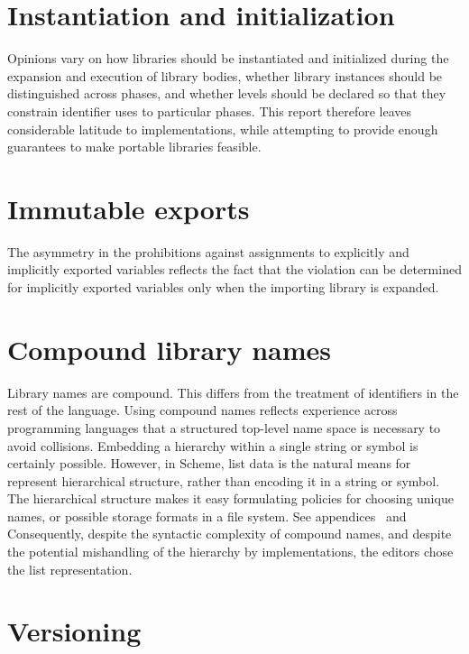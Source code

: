 \documentclass[twoside,twocolumn]{algol60}
\begin{document}
\section{Instantiation and initialization}

Opinions vary on how libraries should be instantiated and
initialized during the expansion and execution of library bodies,
whether library instances should be distinguished across phases,
and whether levels should be declared so that they constrain 
identifier uses to particular phases. This report therefore leaves
considerable latitude to implementations, while attempting to
provide enough guarantees to make portable libraries feasible.

\section{Immutable exports}

The asymmetry in the prohibitions against assignments to explicitly
and implicitly exported variables reflects the fact that the violation
can be determined for implicitly exported variables only when the
importing library is expanded.

\section{Compound library names}

Library names are compound.  This differs from the treatment of
identifiers in the rest of the language.  Using compound names
reflects experience across programming languages that a structured
top-level name space is necessary to avoid collisions.  Embedding a
hierarchy within a single string or symbol is certainly possible.
However, in Scheme, list data is the natural means for represent
hierarchical structure, rather than encoding it in a string or symbol.
The hierarchical structure makes it easy formulating policies for
choosing unique names, or possible storage formats in a file system.
See appendices~
and  Consequently, despite the syntactic complexity of compound
names, and despite the potential mishandling of the hierarchy by
implementations, the editors chose the list representation.

\section{Versioning}
\end{document}
